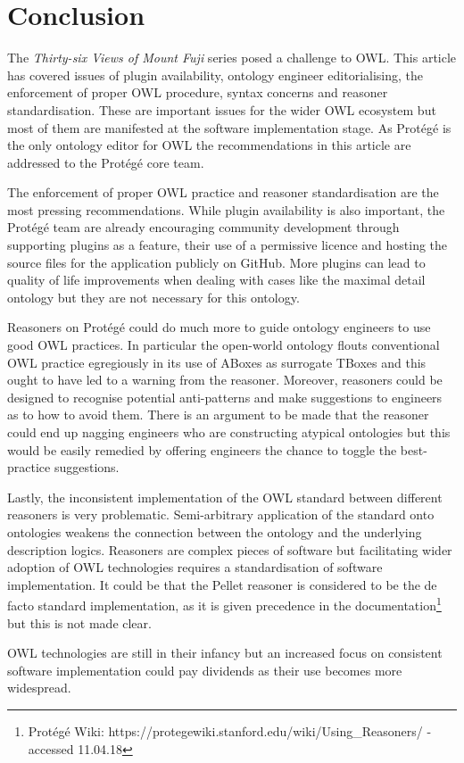 \documentclass[titlepage,a4paper,12pt,oneside]{book}
\begin{document}
\chapter{Conclusion}
The \textit{Thirty-six Views of Mount Fuji} series posed a challenge to OWL.
This article has covered issues of plugin availability, ontology engineer editorialising, the enforcement of proper OWL procedure, syntax concerns and reasoner standardisation.
These are important issues for the wider OWL ecosystem but most of them are manifested at the software implementation stage.
As Protégé is the only ontology editor for OWL the recommendations in this article are addressed to the Protégé core team.\par
The enforcement of proper OWL practice and reasoner standardisation are the most pressing recommendations.
While plugin availability is also important, the Protégé team are already encouraging community development through supporting plugins as a feature, their use of a permissive licence and hosting the source files for the application publicly on GitHub.
More plugins can lead to quality of life improvements when dealing with cases like the maximal detail ontology but they are not necessary for this ontology.\par
Reasoners on Protégé could do much more to guide ontology engineers to use good OWL practices.
In particular the open-world ontology flouts conventional OWL practice egregiously in its use of ABoxes as surrogate TBoxes and this ought to have led to a warning from the reasoner.
Moreover, reasoners could be designed to recognise potential anti-patterns and make suggestions to engineers as to how to avoid them.
There is an argument to be made that the reasoner could end up nagging engineers who are constructing atypical ontologies but this would be easily remedied by offering engineers the chance to toggle the best-practice suggestions.\par
Lastly, the inconsistent implementation of the OWL standard between different reasoners is very problematic.
Semi-arbitrary application of the standard onto ontologies weakens the connection between the ontology and the underlying description logics.
Reasoners are complex pieces of software but facilitating wider adoption of OWL technologies requires a standardisation of software implementation.
It could be that the Pellet reasoner is considered to be the de facto standard implementation, as it is given precedence in the documentation\footnote{Protégé Wiki: https://protegewiki.stanford.edu/wiki/Using\_Reasoners/ - accessed 11.04.18} but this is not made clear.\par
OWL technologies are still in their infancy but an increased focus on consistent software implementation could pay dividends as their use becomes more widespread. 
\end{document}
